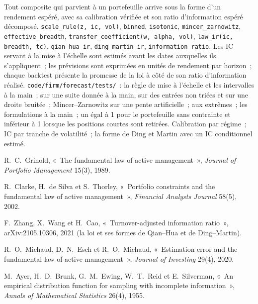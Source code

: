 \begin{build}
 Tout composite qui parvient à un portefeuille arrive sous la forme d'un rendement espéré, avec sa calibration vérifiée et son ratio d'information espéré
décomposé.
 \texttt{scale\_rule(z, ic, vol)}, \texttt{binned}, \texttt{isotonic}, \texttt{mincer\_zarnowitz}, \texttt{effective\_breadth},
\texttt{transfer\_coefficient(w, alpha, vol)}, \texttt{law\_ir(ic, breadth, tc)}, \texttt{qian\_hua\_ir}, \texttt{ding\_martin\_ir},
\texttt{information\_ratio}.
 Les IC servant à la mise à l'échelle sont estimés avant les dates auxquelles ils s'appliquent~; les prévisions sont exprimées en unités de rendement par horizon~; chaque backtest présente la
promesse de la loi à côté de son ratio d'information réalisé.
 \texttt{code/firm/forecast/tests/}~: la règle de mise à l'échelle et les intervalles à la main~;  sur une suite donnée à la main, sur des entrées non
triées et sur une droite bruitée~; Mincer--Zarnowitz sur une pente artificielle~;  aux extrêmes~; les formulations à la main~; un  égal à 1
pour le portefeuille sans contrainte et inférieur à 1 lorsque les positions courtes sont retirées.
 Calibration par régime~; IC par tranche de volatilité~; la forme de Ding et Martin avec un IC conditionnel estimé.
\end{build}

\begin{omsources}
\item R.~C.~Grinold, «~The fundamental law of active management~», \emph{Journal of Portfolio Management} 15(3), 1989.
\item R.~Clarke, H.~de Silva et S.~Thorley, «~Portfolio constraints and the fundamental law of active management~», \emph{Financial Analysts Journal}
58(5), 2002.
\item F.~Zhang, X.~Wang et H.~Cao, «~Turnover-adjusted information ratio~», arXiv:2105.10306, 2021 (la loi et ses formes de Qian--Hua et de Ding--Martin).
\item R.~O.~Michaud, D.~N.~Esch et R.~O.~Michaud, «~Estimation error and the fundamental law of active management~», \emph{Journal of Investing}
29(4), 2020.
\item M.~Ayer, H.~D.~Brunk, G.~M.~Ewing, W.~T.~Reid et E.~Silverman, «~An empirical distribution function for sampling with incomplete information~»,
\emph{Annals of Mathematical Statistics} 26(4), 1955.
\end{omsources}

